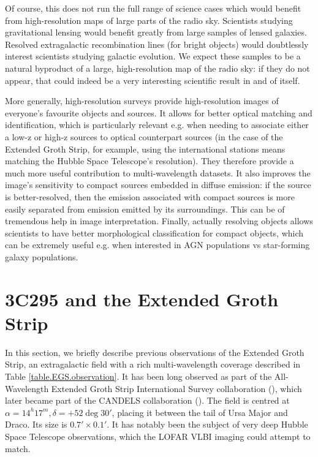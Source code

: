 \pg
Of course, this does not run the full range of science cases which would benefit from high-resolution maps of large parts of the radio sky. Scientists studying gravitational lensing would benefit greatly from large samples of lensed galaxies. Resolved extragalactic recombination lines (for bright objects) would doubtlessly interest scientists studying galactic evolution. We expect these samples to be a natural byproduct of a large, high-resolution map of the radio sky: if they do not appear, that could indeed be a very interesting scientific result in and of itself.

\pg
More generally, high-resolution surveys provide high-resolution images of everyone's favourite objects and sources. It allows for better optical matching and identification, which is particularly relevant e.g. when needing to associate either a low-z or high-z sources to optical counterpart sources (in the case of the Extended Groth Strip, for example, using the international stations means matching the Hubble Space Telescope's resolution). They therefore provide a much more useful contribution to multi-wavelength datasets. It also improves the image's sensitivity to compact sources embedded in diffuse emission: if the source is better-resolved, then the emission associated with compact sources is more easily separated from emission emitted by its surroundings. This can be of tremendous help in image interpretation. Finally, actually resolving objects allows scientists to have better morphological classification for compact objects, which can be extremely useful e.g. when interested in AGN populations vs star-forming galaxy populations.




\section{3C295 and the Extended Groth Strip}

\pg
In this section, we briefly describe previous observations of the Extended Groth Strip, an extragalactic field with a rich multi-wavelength coverage described in Table \ref{table.EGS.observation}. It has been long observed as part of the All-Wavelength Extended Groth Strip International Survey collaboration (), which later became part of the CANDELS collaboration (). The field is centred at $\alpha=14^h17^m,\delta=+52\deg 30'$, placing it between the tail of Ursa Major and Draco. Its size is $0.7'\times 0.1'$. It has notably been the subject of very deep Hubble Space Telescope observations, which the LOFAR VLBI imaging could attempt to match. 

